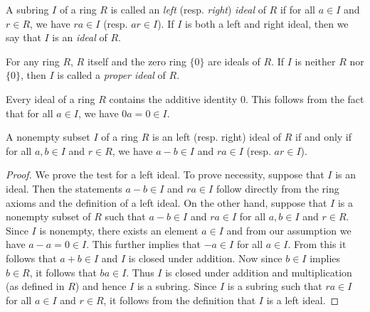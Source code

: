 \begin{definition}
    A subring \(I\) of a ring \(R\) is called an \emph{left} (resp.
    \emph{right}) \emph{ideal} of \(R\) if for all \(a \in I\) and \(r \in R\),
    we have \(ra \in I\) (resp. \(ar \in I\)). If \(I\) is both a left and right
    ideal, then we say that \(I\) is an \emph{ideal} of \(R\).
\end{definition}

\begin{example}
    For any ring \(R\), \(R\) itself and the zero ring \(\{0\}\) are ideals of
    \(R\). If \(I\) is neither \(R\) nor \(\{0\}\), then \(I\) is called a
    \emph{proper ideal} of \(R\).
\end{example}

\begin{remark}
    \label{rem:ideal-contains-0}
    Every ideal of a ring \(R\) contains the additive identity \(0\). This
    follows from the fact that for all \(a \in I\), we have \(0a = 0 \in I\).
\end{remark}

\begin{theorem}
    A nonempty subset \(I\) of a ring \(R\) is an left (resp. right) ideal of
    \(R\) if and only if for all \(a, b \in I\) and \(r \in R\), we have \(a - b
    \in I\) and \(ra \in I\) (resp. \(ar \in I\)).
\end{theorem}

\begin{proof}
    We prove the test for a left ideal. To prove necessity, suppose that \(I\)
    is an ideal. Then the statements \(a - b \in I\) and \(ra \in I\) follow
    directly from the ring axioms and the definition of a left ideal. On the
    other hand, suppose that \(I\) is a nonempty subset of \(R\) such that \(a -
    b \in I\) and \(ra \in I\) for all \(a, b \in I\) and \(r \in R\). Since
    \(I\) is nonempty, there exists an element \(a \in I\) and from our
    assumption we have \(a - a = 0 \in I\). This further implies that \(-a \in
    I\) for all \(a \in I\). From this it follows that \(a + b \in I\) and \(I\)
    is closed under addition. Now since \(b \in I\) implies \(b \in R\), it
    follows that \(ba \in I\). Thus \(I\) is closed under addition and
    multiplication (as defined in \(R\)) and hence \(I\) is a subring. Since
    \(I\) is a subring such that \(ra \in I\) for all \(a \in I\) and \(r \in
    R\), it follows from the definition that \(I\) is a left ideal.
\end{proof}

